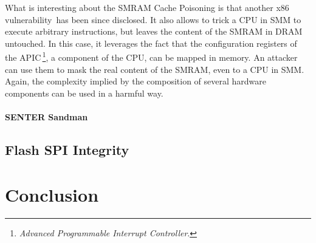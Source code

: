What is interesting about the SMRAM Cache Poisoning is that another x86
vulnerability\,\cite{domas2015sinkhole} has been since disclosed.
%
It also allows to trick a CPU in SMM to execute arbitrary instructions, but
leaves the content of the SMRAM in DRAM untouched.
%
In this case, it leverages the fact that the configuration registers of the
APIC\,\footnote{\emph{Advanced Programmable Interrupt Controller}.}, a component
of the CPU, can be mapped in memory.
%
An attacker can use them to mask the real content of the SMRAM, even to a CPU in
SMM.
%
Again, the complexity implied by the composition of several hardware components
can be used in a harmful way.

\paragraph{SENTER Sandman}

\subsection{Flash SPI Integrity}

\section{Conclusion}
\label{sec:usecase:conclusion}
